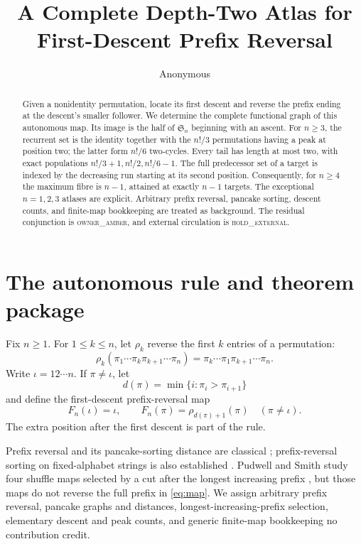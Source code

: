 \documentclass[a4paper,10pt]{amsart}
\title[First-descent prefix reversal]{A Complete Depth-Two Atlas for\\
First-Descent Prefix Reversal}
\author{Anonymous}
\date{}
\theoremstyle{remark}
\begin{document}
\begin{abstract}
Given a nonidentity permutation, locate its first descent and reverse the
prefix ending at the descent's smaller follower.  We determine the complete
functional graph of this autonomous map.  Its image is the half of
$\mathfrak S_n$ beginning with an ascent.  For $n\ge3$, the recurrent set is
the identity together with the $n!/3$ permutations having a peak at position
two; the latter form $n!/6$ two-cycles.  Every tail has length at most two,
with exact populations $n!/3+1,n!/2,n!/6-1$.  The full predecessor set of a
target is indexed by the decreasing run starting at its second position.
Consequently, for $n\ge4$ the maximum fibre is $n-1$, attained at exactly
$n-1$ targets.  The exceptional $n=1,2,3$ atlases are explicit.  Arbitrary
prefix reversal, pancake sorting, descent counts, and finite-map bookkeeping
are treated as background.  The residual conjunction is
\textsc{owner\_amber}, and external circulation is
\textsc{hold\_external}.
\end{abstract}

\maketitle

\section{The autonomous rule and theorem package}

Fix $n\ge1$.  For $1\le k\le n$, let $\rho_k$ reverse the first $k$ entries of a
permutation:
\begin{equation}\label{eq:prefix-reversal}
 \rho_k(\pi_1\cdots\pi_k\pi_{k+1}\cdots\pi_n)
 =\pi_k\cdots\pi_1\pi_{k+1}\cdots\pi_n.
\end{equation}
Write $\iota=12\cdots n$.  If $\pi\ne\iota$, let
\begin{equation}\label{eq:first-descent}
 d(\pi)=\min\{i: \pi_i>\pi_{i+1}\}
\end{equation}
and define the first-descent prefix-reversal map
\begin{equation}\label{eq:map}
 F_n(\iota)=\iota,\qquad
 F_n(\pi)=\rho_{d(\pi)+1}(\pi)\quad(\pi\ne\iota).
\end{equation}
The extra position after the first descent is part of the rule.

Prefix reversal and its pancake-sorting distance are classical
\cite{GatesPapadimitriou1979}; prefix-reversal sorting on fixed-alphabet
strings is also established \cite{HurkensEtAl2007}.  Pudwell and Smith study
four shuffle maps selected by a cut after the longest increasing prefix
\cite{PudwellSmith2024}, but those maps do not reverse the full prefix in
\eqref{eq:map}.  We assign arbitrary prefix reversal, pancake graphs and
distances, longest-increasing-prefix selection, elementary descent and peak
counts, and generic finite-map bookkeeping no contribution credit.
\end{document}
